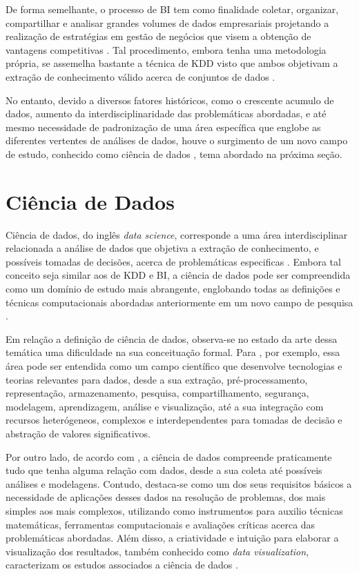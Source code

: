 De forma semelhante, o processo de BI tem como finalidade coletar, organizar, compartilhar e analisar grandes volumes de dados empresariais projetando a realização de estratégias em gestão de negócios que visem a obtenção de vantagens competitivas \cite{cap02_ref16, cap02_ref15}. Tal procedimento, embora tenha uma metodologia própria, se assemelha bastante a técnica de KDD visto que ambos objetivam a extração de conhecimento válido acerca de conjuntos de dados \cite{cap02_ref17}. 

No entanto, devido a diversos fatores históricos, como o crescente acumulo de dados, aumento da interdisciplinaridade das problemáticas abordadas, e até mesmo necessidade de padronização de uma área específica que englobe as diferentes vertentes de análises de dados, houve o surgimento de um novo campo de estudo, conhecido como ciência de dados \cite{cap02_ref2, cap02_ref9, cap02_ref33, cap02_ref32}, tema abordado na próxima seção.

\section{Ciência de Dados}

Ciência de dados, do inglês \textit{data science}, corresponde a uma área interdisciplinar relacionada a análise de dados que objetiva a extração de conhecimento, e possíveis tomadas de decisões, acerca de problemáticas especificas \cite{cap02_ref1, cap02_ref4}. Embora tal conceito seja similar aos de KDD e BI, a ciência de dados pode ser compreendida como um domínio de estudo mais abrangente, englobando todas as definições e técnicas computacionais abordadas anteriormente em um novo campo de pesquisa \cite{cap02_ref2}.

Em relação a definição de ciência de dados, observa-se no estado da arte dessa temática uma dificuldade na sua conceituação formal. Para \cite{cap02_ref33}, por exemplo, essa área pode ser entendida como um campo científico que desenvolve tecnologias e teorias relevantes para dados, desde a sua extração, pré-processamento, representação, armazenamento, pesquisa, compartilhamento, segurança, modelagem, aprendizagem, análise e visualização, até a sua integração com recursos heterógeneos, complexos e interdependentes para tomadas de decisão e abstração de valores significativos.

Por outro lado, de acordo com \cite{cap02_ref34}, a ciência de dados compreende praticamente tudo que tenha alguma relação com dados, desde a sua coleta até possíveis análises e modelagens. Contudo, destaca-se como um dos seus requisitos básicos a necessidade de aplicações desses dados na resolução de problemas, dos mais simples aos mais complexos, utilizando como instrumentos para auxilio técnicas matemáticas, ferramentas computacionais e avaliações críticas acerca das problemáticas abordadas. Além disso, a criatividade e intuição para elaborar a visualização dos resultados, também conhecido como \textit{data visualization}, caracterizam os estudos associados a ciência de dados \cite{cap02_ref18}.

